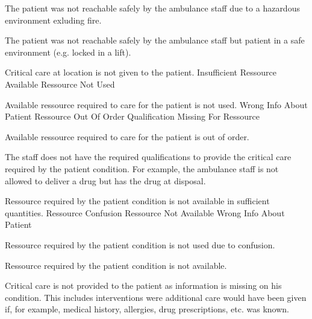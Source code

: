   \startkaosspec
  	 {The patient was not reachable safely by the ambulance staff due to a hazardous environment exluding fire.}
  \stopkaosspec
  
  \startkaosspec
  	 {The patient was not reachable safely by the ambulance staff but patient in a safe environment (e.g. locked in a lift).}
  \stopkaosspec
  
  \startkaosspec
  	 {Critical care at location is not given to the patient.}
  	 {Insufficient Ressource}
  	 {Available Ressource Not Used}
  \stopkaosspec
  
  \startkaosspec
  	 {Available ressource required to care for the patient is not used.}
  	 {Wrong Info About Patient}
  	 {Ressource Out Of Order}
  	 {Qualification Missing For Ressource}
  \stopkaosspec
  
  \startkaosspec
  	 {Available ressource required to care for the patient is out of order.}
  \stopkaosspec
  
  \startkaosspec
  	 {The staff does not have the required qualifications to provide the critical care required by the patient condition. For example, the ambulance staff is not allowed to deliver a drug but has the drug at disposal.}
  \stopkaosspec
  
  \startkaosspec
  	 {Ressource required by the patient condition is not available in sufficient quantities.}
  	 {Ressource Confusion}
  	 {Ressource Not Available}
  	 {Wrong Info About Patient}
  \stopkaosspec
  
  \startkaosspec
  	 {Ressource required by the patient condition is not used due to confusion.}
  \stopkaosspec
  
  \startkaosspec
  	 {Ressource required by the patient condition is not available.}
  \stopkaosspec
  
  \startkaosspec
  	 {Critical care is not provided to the patient as information is missing on his condition. This includes interventions were additional care would have been given if, for example, medical history, allergies, drug prescriptions, etc. was known.}
  \stopkaosspec
  
